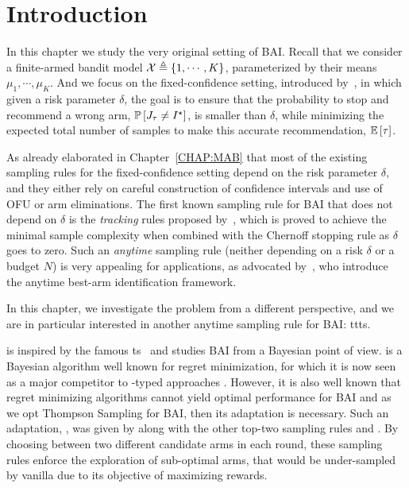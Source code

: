 \section{Introduction}\label{sec:t3c.intro}

In this chapter we study the very original setting of BAI. Recall that we consider a finite-armed bandit model $\mathcal{X}\triangleq\{1,\cdots,K\}$, parameterized by their means $\mu_1, \cdots, \mu_K$. And we focus on the fixed-confidence setting, introduced by~\cite{even-dar2003confidence}, in which given a risk parameter $\delta$, the goal is to ensure that the probability to stop and recommend a wrong arm, $\mathbb{P}\left[J_\tau \neq I^\star\right]$, is smaller than $\delta$, while minimizing the expected total number of samples to make this accurate recommendation, $\mathbb{E}\left[\tau\right]$. 


As already elaborated in Chapter~\ref{CHAP:MAB} that most of the existing sampling rules for the fixed-confidence setting depend on the risk parameter $\delta$, and they either rely on careful construction of confidence intervals and use of OFU or arm eliminations. The first known sampling rule for BAI that does not depend on $\delta$ is the \emph{tracking} rules proposed by~\cite{garivier2016tracknstop}, which is proved to achieve the minimal sample complexity when combined with the Chernoff stopping rule as $\delta$ goes to zero. Such an \emph{anytime} sampling rule (neither depending on a risk $\delta$ or a budget $N$) is very appealing for applications, as advocated by~\cite{jun2016atlucb}, who introduce the anytime best-arm identification framework. 


In this chapter, we investigate the problem from a different perspective, and we are in particular interested in another anytime sampling rule for BAI: \gls{ttts}. 

\TTTS is inspired by the famous \gls{ts}~\citep{thompson1933} and studies BAI from a Bayesian point of view. \TS is a Bayesian algorithm well known for regret minimization, for which it is now seen as a major competitor to \UCB-typed approaches \citep{burnetas1996optimal,auer2002ucb,cappe2013klucb}. However, it is also well known that regret minimizing algorithms cannot yield optimal performance for BAI \citep{bubeck2011pure,kaufmann2017survey} and as we opt Thompson Sampling for BAI, then its adaptation is necessary. Such an adaptation, \TTTS, was given by \citet{russo2016ttts} along with the other top-two sampling rules \TTPS and \TTVS. By choosing between two different candidate arms in each round, these sampling rules enforce the exploration of sub-optimal arms, that would be under-sampled by vanilla \TS due to its objective of maximizing rewards.

